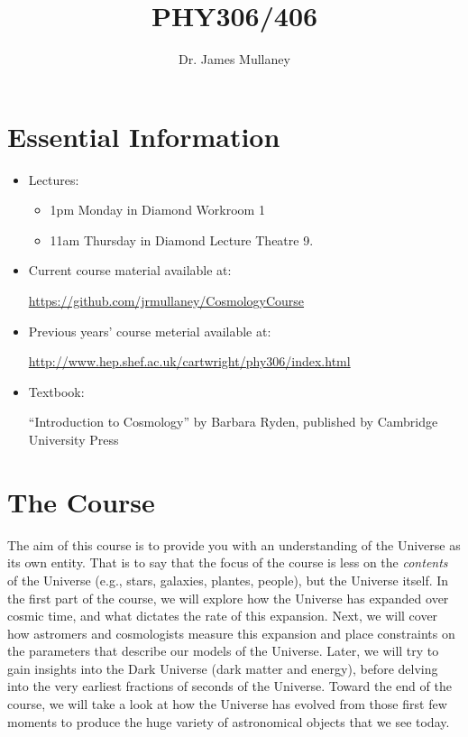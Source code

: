 \documentclass[11pt]{article}
\begin{document}
     
    \title{PHY306/406}
    \author{Dr. James Mullaney}
    \maketitle
    
    \section{Essential Information}
    \begin{itemize}
    
    \item Lectures:
    \begin{itemize}
        \item 1pm Monday in Diamond Workroom 1
        \item 11am Thursday in Diamond Lecture Theatre 9.
    \end{itemize}

    \item Current course material available at:

    \noindent
    \url{https://github.com/jrmullaney/CosmologyCourse}

    \item Previous years' course meterial available at:

    \noindent
    \url{http://www.hep.shef.ac.uk/cartwright/phy306/index.html}

    \item Textbook:
    
    \noindent
    ``Introduction to Cosmology'' by Barbara Ryden, published by Cambridge University Press
\end{itemize}

    \section{The Course}
    The aim of this course is to provide you with an understanding of the Universe as its own entity. That is to say that the focus of the course is less on the {\it contents} of the Universe (e.g., stars, galaxies, plantes, people), but the Universe itself. In the first part of the course, we will explore how the Universe has expanded over cosmic time, and what dictates the rate of this expansion. Next, we will cover how astromers and cosmologists measure this expansion and place constraints on the parameters that describe our models of the Universe. Later, we will try to gain insights into the Dark Universe (dark matter and energy), before delving into the very earliest fractions of seconds of the Universe. Toward the end of the course, we will take a look at how the Universe has evolved from those first few moments to produce the huge variety of astronomical objects that we see today.
    
\end{document}
